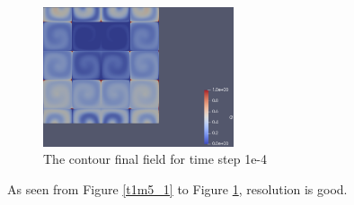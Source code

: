 \documentclass{article}
\begin{document}
\begin{figure}[hbt!]
    \centering
    \includegraphics[width=0.5\textwidth]{Figures/e-4 320x320/contour.png}
    \caption{The contour final field for time step 1e-4}
    \label{t1m5_2} 
\end{figure}

As seen from Figure \ref{t1m5_1} to Figure \ref{t1m5_2}, resolution is good.



\clearpage
\end{document}
